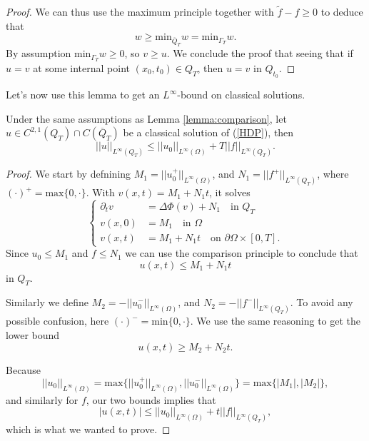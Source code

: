 \documentclass[11pt, a4paper]{article}
\begin{document}
\begin{proof}
We can thus use the maximum principle together with $\tilde{f}-f \geq 0$ to deduce that
\begin{equation*}
w \geq \mathrm{min}_{\overline{Q}_T}w = \mathrm{min}_{\Gamma_T}w.
\end{equation*}
By assumption $\mathrm{min}_{\Gamma_T}w \geq 0$, so $v \geq u$. We conclude the proof that seeing that if $u=v$ at some internal point $(x_0,t_0) \in Q_T$, then $u=v$ in $Q_{t_0}$.
\end{proof}


Let's now use this lemma to get an $L^\infty$-bound on classical solutions.
\begin{cor}
\label{cor:Linf_bound_classical}
Under the same assumptions as Lemma \ref{lemma:comparison},  let $u \in C^{2,1}(Q_T)\cap C(\overline{Q}_T)$ be a classical solution of (\ref{HDP}), then
	\begin{equation}
		\label{infinity_bound}
		||u||_{L^\infty(Q_T)} \leq ||u_0||_{L^\infty(\Omega)} + T||f||_{L^\infty(Q_T)}.
	\end{equation}
\end{cor}

\begin{proof}
We start by defnining $M_1 = ||u_0^+||_{L^\infty(\Omega)} $, and $N_1 = ||f^+||_{L^\infty(Q_T)}$, where $(\cdot)^+ = \mathrm{max} \{ 0,\cdot \}$. With $v(x,t) = M_1 + N_1t$, it solves
\begin{equation*}
\begin{cases}
	\partial_t v &= \Delta\Phi(v) +N_1 \quad \text{in } Q_T\\
	v(x,0) &= M_1 \quad \text{in } \Omega \\
	v(x,t) &= M_1 + N_1t \quad \text{on } \partial \Omega \times [0,T].
\end{cases}
\end{equation*}
Since $u_0 \leq M_1$ and $f\leq N_1$ we can use the comparison principle to conclude that
\begin{equation*}
u(x,t) \leq M_1 + N_1t
\end{equation*}
in $Q_T$.

Similarly we define $M_2 = -||u_0^-||_{L^\infty(\Omega)}$, and $N_2 = -||f^-||_{L^\infty(Q_T)}$. To avoid any possible confusion, here $(\cdot)^- = \mathrm{min}\{0, \cdot \}$. We use the same reasoning to get the lower bound
\begin{equation*}
u(x,t) \geq M_2 + N_2t.
\end{equation*}

Because
\begin{equation*}
||u_0||_{L^\infty(\Omega)} = \mathrm{max}\{ ||u_0^+||_{L^\infty(\Omega)}, ||u_0^-||_{L^\infty(\Omega)} \} = \mathrm{max}\{|M_1|,|M_2|\},
\end{equation*}
and similarly for $f$, our two bounds implies that
\begin{equation*}
|u(x,t)| \leq ||u_0||_{L^\infty(\Omega)} + t||f||_{L^\infty(Q_T)},
\end{equation*}
which  is what we wanted to prove.

\end{proof}
\end{document}

